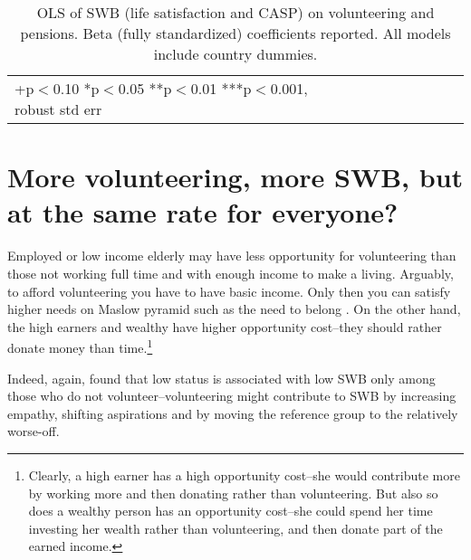 \documentclass[10pt, letterpaper]{article}
\begin{document}
\begin{spacing}{1.4}
\begin{spacing}{.9}
\begin{table}[H]\centering \caption{OLS of SWB (life satisfaction and CASP) on
    volunteering and pensions. Beta (fully standardized) coefficients reported. All models
    include country dummies.}  \begin{scriptsize} \begin{tabular}{p{1.8in}p{.5in}p{.5in}|p{.5in}p{.5in}p{.5in}p{.5in}p{.5in}p{.5in}p{.5in}p{.4in}p{.5in}p{.4in}}\hline 
      \hline\multicolumn{5}{l}{+p$<$0.10 *p$<$0.05 **p$<$0.01 ***p$<$0.001,
        robust std err} \end{tabular}\label{regCw6} \end{scriptsize}\end{table}
\end{spacing}



\section*{More volunteering, more SWB, but at the same rate for everyone?}

 Employed or low income elderly may have less opportunity for
 volunteering than those not working full time and with enough income to make a
 living. %
%
Arguably, to afford volunteering you have to have basic income. Only then you can
satisfy  higher needs on Maslow pyramid  such as the need to belong
\citep{maslow87}. On the other hand, the high earners and wealthy have higher
opportunity cost--they should rather donate money than time.\footnote{Clearly, a
high earner has a high opportunity cost--she would contribute more by working
more and then donating rather than volunteering. But also so does a wealthy
person has an opportunity cost--she could spend her time investing her wealth
rather than volunteering, and then donate part of the earned income.}

Indeed, again, \citet{borgonovi2008doing} found that low status is associated
with low SWB only among those who do not volunteer--volunteering
might contribute to SWB by increasing empathy, shifting aspirations and by
moving the reference group to the relatively worse-off.


\end{spacing}
\end{document}
